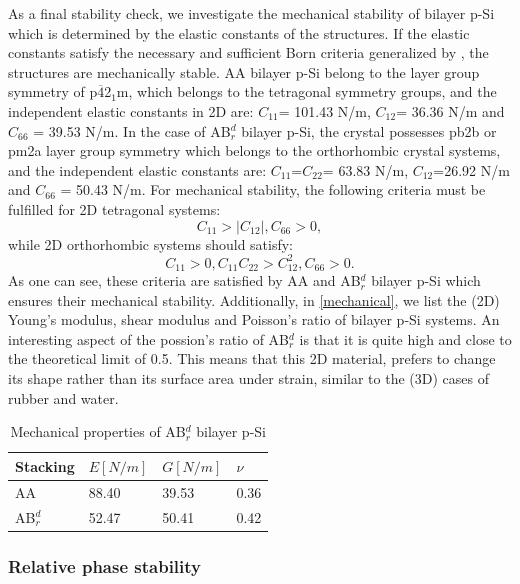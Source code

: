 As a final stability check, we investigate the mechanical stability of bilayer p-Si which is determined by the elastic constants of the structures. If the elastic constants satisfy the necessary and sufficient Born criteria generalized by \citet{Mouhat2014}, the structures are mechanically stable. AA bilayer p-Si belong to the layer group symmetry of p$\overline{4}$2$_1$m, which belongs to the tetragonal symmetry groups, and the independent elastic constants in 2D are: $C_{11}$= 101.43 N/m, $C_{12}$= 36.36 N/m and $C_{66}$ = 39.53  N/m. In the case of AB$_r^d$ bilayer p-Si, the crystal possesses pb2b or pm2a layer group symmetry which belongs to the orthorhombic crystal systems, and the independent elastic constants are: $C_{11}$=$C_{22}$= 63.83 N/m, $C_{12}$=26.92 N/m and $C_{66}$ = 50.43 N/m.  For mechanical stability, the following criteria must be fulfilled for 2D tetragonal systems:
\begin{equation}
C_{11}>|C_{12}|, C_{66}>0,
\end{equation}
while 2D orthorhombic systems should satisfy:
\begin{equation}
C_{11}>0,C_{11}C_{22}>C_{12}^2, C_{66}>0.
\end{equation}
As one can see, these criteria are satisfied by AA and AB$_r^d$ bilayer p-Si which ensures their mechanical stability. Additionally, in \autoref{mechanical}, we list the  (2D) Young's modulus, shear modulus and Poisson's ratio of bilayer p-Si systems. An interesting aspect of the possion's ratio of AB$_r^d$ is that it is quite high and close to the theoretical limit of 0.5. This means that this 2D material, prefers to change its shape rather than its surface area under strain, similar to the (3D) cases of rubber and water.

\begin{table}[htbp]
\centering
\caption{Mechanical properties of AB$_r^d$ bilayer p-Si}
\label{mechanical}
\begin{tabularx}{\textwidth}{lXXX}
\hline
Stacking & $E[N/m]$ & $G[N/m]$ & $\nu$ \\ \hline
AA & 88.40 & 39.53 & 0.36 \\ 
AB$_r^d$ & 52.47 & 50.41 & 0.42  \\ \hline
\end{tabularx}
\end{table}

\subsubsection{Relative phase stability}\label{hexa}

